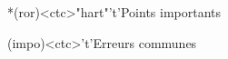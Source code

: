 \documentclass[../../main/main.tex]{subfiles}
\begin{document}
\begin{tcn}[sidebyside, fontupper=\small, fontlower=\small]
	\begin{tcn}*(ror)<ctc>"hart"'t'{Points importants}
	\end{tcn}
	\begin{tcn}(impo)<ctc>'t'{Erreurs communes}
	\end{tcn}
\end{tcn}

\vspace*{\fill}
\newpage

\end{document}
